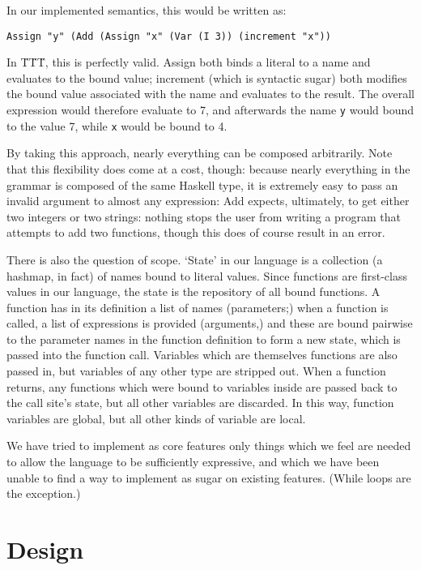 \documentclass{article}
\begin{document}
In our implemented semantics, this would be written as:

\begin{lstlisting}
Assign "y" (Add (Assign "x" (Var (I 3)) (increment "x"))
\end{lstlisting}

In \"T\"T\"T, this is perfectly valid.  Assign both binds a literal to a name and evaluates to the bound value; increment (which is syntactic sugar) both modifies the bound value associated with the name and evaluates to the result.  The overall expression would therefore evaluate to 7, and afterwards the name \texttt{y} would bound to the value 7, while \texttt{x} would be bound to 4.

By taking this approach, nearly everything can be composed arbitrarily.  Note that this flexibility does come at a cost, though: because nearly everything in the grammar is composed of the same Haskell type, it is extremely easy to pass an invalid argument to almost any expression: Add expects, ultimately, to get either two integers or two strings: nothing stops the user from writing a program that attempts to add two functions, though this does of course result in an error.

There is also the question of scope.  `State' in our language is a collection (a hashmap, in fact) of names bound to literal values.  Since functions are first-class values in our language, the state is the repository of all bound functions.  A function has in its definition a list of names (parameters;) when a function is called, a list of expressions is provided (arguments,) and these are bound pairwise to the parameter names in the function definition to form a new state, which is passed into the function call.  Variables which are themselves functions are also passed in, but variables of any other type are stripped out.  When a function returns, any functions which were bound to variables inside are passed back to the call site's state, but all other variables are discarded.  In this way, function variables are global, but all other kinds of variable are local.


We have tried to implement as core features only things which we feel are needed to allow the language to be sufficiently expressive, and which we have been unable to find a way to implement as sugar on existing features.  (While loops are the exception.)

\section*{Design}
\end{document}
